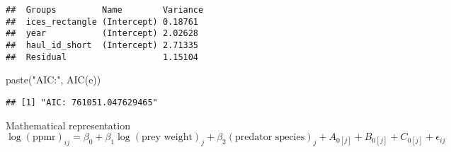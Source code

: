 \documentclass[
]{article}
\newenvironment{Shaded}{\begin{snugshade}}{\end{snugshade}}
\newcommand{\AttributeTok}[1]{\textcolor[rgb]{0.77,0.63,0.00}{#1}}
\newcommand{\DecValTok}[1]{\textcolor[rgb]{0.00,0.00,0.81}{#1}}
\newcommand{\FunctionTok}[1]{\textcolor[rgb]{0.00,0.00,0.00}{#1}}
\newcommand{\NormalTok}[1]{#1}
\newcommand{\OtherTok}[1]{\textcolor[rgb]{0.56,0.35,0.01}{#1}}
\newcommand{\SpecialCharTok}[1]{\textcolor[rgb]{0.00,0.00,0.00}{#1}}
\newcommand{\StringTok}[1]{\textcolor[rgb]{0.31,0.60,0.02}{#1}}
\begin{document}
\begin{verbatim}
##  Groups         Name        Variance
##  ices_rectangle (Intercept) 0.18761 
##  year           (Intercept) 2.02628 
##  haul_id_short  (Intercept) 2.71335 
##  Residual                   1.15104
\end{verbatim}

\begin{Shaded}
\begin{Highlighting}[]
\FunctionTok{paste}\NormalTok{(}\StringTok{"AIC:"}\NormalTok{, }\FunctionTok{AIC}\NormalTok{(e))}
\end{Highlighting}
\end{Shaded}

\begin{verbatim}
## [1] "AIC: 761051.047629465"
\end{verbatim}

Mathematical representation \[
  \log(\text{ppmr})_{ij} = \beta_{0} + \beta_{1} \log(\text{prey weight})_{j} + 
                \beta_{2} (\text{predator species})_{j} + A_{0[j]} + B_{0[j]} + 
                C_{0[j]} + \epsilon_{ij}
\]

\begin{Shaded}
\end{Shaded}
\end{document}

